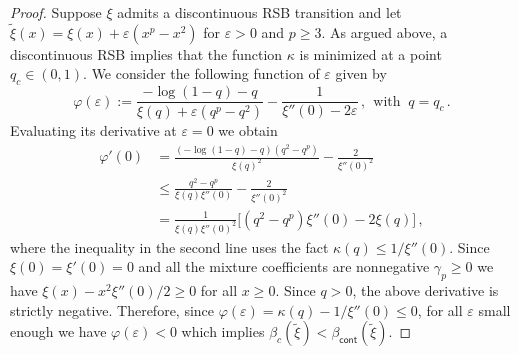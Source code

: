 \documentclass[11pt]{article}
\theoremstyle{definition}
\numberwithin{equation}{section}
\newcommand{\<}{\langle}
\renewcommand{\>}{\rangle}
\def\eps{\varepsilon}
\def\cont{{\mathsf{cont}}}
\begin{document}
\begin{proof}
Suppose $\xi$ admits a discontinuous RSB transition and let $\tilde{\xi}(x) = \xi(x) + \eps (x^p - x^2)$ for $\eps>0$ and $p \ge 3$. As argued above, a discontinuous RSB implies that the function $\kappa$ is minimized at a point $q_c\in (0,1)$.
 We consider the following function of $\eps$ given by
\begin{equation*}
\varphi(\eps) := \frac{-\log(1-q)-q}{\xi(q)+\eps (q^p - q^2)} - \frac{1}{\xi''(0)-2\eps}\,,~~\mbox{with }~ q = q_c\,. 
\end{equation*}
Evaluating its derivative at $\eps=0$ we obtain
\begin{align*}
\varphi'(0) &= \frac{(-\log(1-q)-q)(q^2 - q^p)}{\xi(q)^2} - \frac{2}{\xi''(0)^2}\\
&\le \frac{q^2 - q^p}{\xi(q)\xi''(0)} - \frac{2}{\xi''(0)^2}\\
&= \frac{1}{\xi(q)\xi''(0)^2}\big[(q^2 - q^p)\xi''(0) - 2\xi(q)\big]\,, 
\end{align*}
where the inequality in the second line uses the fact $\kappa(q) \le 1/\xi''(0)$. 
Since $\xi(0) = \xi'(0)=0$ and all the mixture coefficients are nonnegative $\gamma_p \ge 0$ we have $\xi(x) - x^2\xi''(0)/2 \ge 0$ for all $x \ge 0$. Since $q>0$, the above derivative is strictly negative. Therefore, since $\varphi(\eps) = \kappa(q) - 1/\xi''(0) \le 0$, for all $\eps$ small enough we have $\varphi(\eps)<0$ which implies $\beta_c(\tilde{\xi}) < \beta_{\cont}(\tilde{\xi})$.  
\end{proof}



\small
\end{document}
